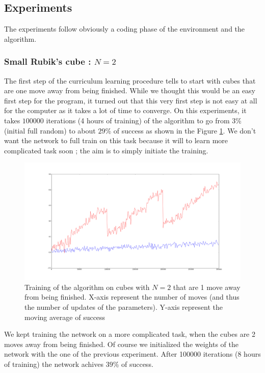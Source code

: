 \documentclass{article} %
\begin{document}
\subsection{Experiments}
The experiments follow obviously a coding phase of the environment and the algorithm.

\subsubsection{Small Rubik's cube : $N=2$}
The first step of the curriculum learning procedure tells to start with cubes that are one move away from being finished. While we thought this would be an easy first step for the program, it turned out that this very first step is not easy at all for the computer as it takes a lot of time to converge. On this experiments, it takes $100000$ iterations (4 hours of training) of the algorithm to go from $3$\% (initial full random) to about $29$\% of success as shown in the Figure \ref{firstfigure}. We don't want the network to full train on this task because it will to learn more complicated task soon ; the aim is to simply initiate the training.

\begin{figure}[h]
\begin{center}
   \includegraphics[scale=0.23]{firstfigure.png}
   \caption{\label{firstfigure} Training of the algorithm on cubes with $N=2$ that are 1 move away from being finished. X-axis represent the number of moves (and thus the number of updates of the parameters). Y-axis represent the moving average of success}
   \end{center}
\end{figure}

We kept training the network on a more complicated task, when the cubes are 2 moves away from being  finished. Of course we initialized the weights of the network with the one of the previous experiment. After 100000 iterations (8 hours of training) the network achives $39$\% of success.
\end{document}
